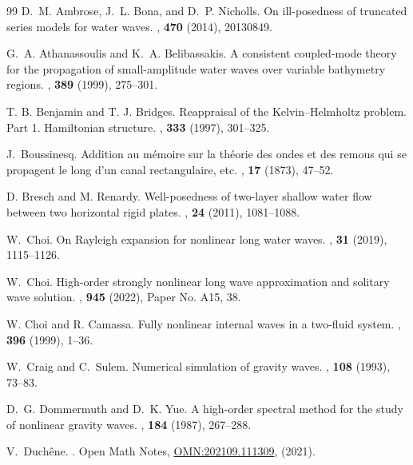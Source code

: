 \documentclass[11pt,leqno]{article}
\numberwithin{equation}{section}
\numberwithin{figure}{section}
\begin{document}
\begin{thebibliography}{99}
%
D.~M. Ambrose, J.~L. Bona, and D.~P. Nicholls. 
\newblock On ill-posedness of truncated series models for water waves.
, {\bf 470} (2014), 20130849. 

G.~A. Athanassoulis and K.~A. Belibassakis. 
\newblock A consistent coupled-mode theory for the propagation of small-amplitude water waves over variable bathymetry regions. 
, {\bf 389} (1999), 275--301.

T. B. Benjamin and T. J. Bridges. 
\newblock Reappraisal of the Kelvin--Helmholtz problem. Part 1. Hamiltonian structure. 
, {\bf 333} (1997), 301--325. 

J.~Boussinesq. 
\newblock Addition au mémoire sur la théorie des ondes et des remous qui se propagent le long d'un canal rectangulaire, etc. 
, {\bf 17} (1873), 47--52.

D. Bresch and M. Renardy. 
\newblock Well-posedness of two-layer shallow water flow between two horizontal rigid plates. 
, {\bf 24} (2011), 1081--1088.

W.~Choi. 
\newblock On {R}ayleigh expansion for nonlinear long water waves.
, {\bf 31} (2019), 1115--1126.

W.~Choi. 
\newblock High-order strongly nonlinear long wave approximation and solitary wave solution. 
, {\bf 945} (2022), Paper No. A15, 38.

W. Choi and R. Camassa. 
	\newblock Fully nonlinear internal waves in a two-fluid system. 
	, {\bf 396} (1999), 1--36.

W.~Craig and C.~Sulem.
\newblock Numerical simulation of gravity waves.
, {\bf 108} (1993), 73--83.

D.~G. Dommermuth and D.~K. Yue.
\newblock A high-order spectral method for the study of nonlinear gravity waves.
, {\bf 184} (1987), 267--288.

V.~Duch\^ene.
.
\newblock Open Math Notes,
\href{https://www.ams.org/open-math-notes/omn-view-listing?listingId=111309}{OMN:202109.111309},
 (2021).


\end{thebibliography}
\end{document}
